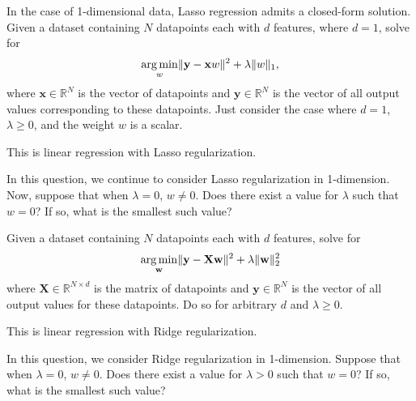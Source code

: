 \medskip
\lstset{
  basicstyle=\small\ttfamily,
  breaklines=true,
  columns=fullflexible
}



\problem[18]

\subproblem
In the case of 1-dimensional data, Lasso regression admits a closed-form solution.
Given a dataset containing $N$ datapoints each with $d$ features, where $d = 1$, solve for
\[\underset{w}{\operatorname{arg\,min}} \Vert\mathbf{y} - \mathbf{x}w\Vert^2 + \lambda\Vert w\Vert_1,
\]
where $\mathbf{x} \in \mathbb{R}^{N}$ is the vector of datapoints and $\mathbf{y} \in \mathbb{R}^N$ is the  vector of all output values corresponding to these datapoints. Just consider the case where $d = 1$, $\lambda \geq 0$, and the weight $w$ is a scalar.

This is linear regression with Lasso regularization.



\subproblem
In this question, we continue to consider Lasso regularization in 1-dimension. Now, suppose that when $\lambda = 0$, $w \neq 0$. Does there exist a value for $\lambda$ such that $w = 0$? If so, what is the smallest such value?



\subproblem
Given a dataset containing $N$ datapoints each with $d$ features, solve for
\[\underset{\mathbf{w}}{\operatorname{arg\,min}} \Vert\mathbf{y} - \mathbf{X}\mathbf{w}\Vert^2 + \lambda\Vert\mathbf{w}\Vert_2^2
\]
where $\mathbf{X} \in \mathbb{R}^{N \times d}$ is the matrix of datapoints and $\mathbf{y} \in \mathbb{R}^N$ is the  vector of all output values for these datapoints. Do so for arbitrary $d$ and $\lambda \geq 0$.

This is linear regression with Ridge regularization.



\subproblem In this question, we consider Ridge regularization in 1-dimension. Suppose that when $\lambda = 0$, $w \neq 0$. Does there exist a value for $\lambda > 0$ such that $w = 0$? If so, what is the smallest such value?




